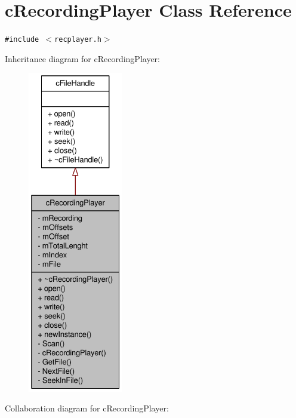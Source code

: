 \hypertarget{classcRecordingPlayer}{
\section{cRecordingPlayer Class Reference}
\label{classcRecordingPlayer}
}
{\tt \#include $<$recplayer.h$>$}

Inheritance diagram for cRecordingPlayer:\nopagebreak
\begin{figure}[H]
\begin{center}
\leavevmode
\includegraphics[height=400pt]{classcRecordingPlayer__inherit__graph}
\end{center}
\end{figure}
Collaboration diagram for cRecordingPlayer:\nopagebreak
